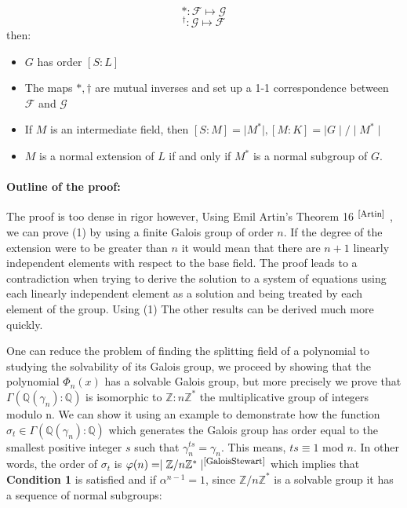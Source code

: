 \documentclass{article}
\begin{document}
$$\ast : \mathscr{F} \mapsto \mathscr{G}$$
$$^{\dagger} : \mathscr{G} \mapsto \mathscr{F}$$
then:
    \begin{itemize}
        \item[(1)] $G$ has order $[S : L]$
        \item [(2)] The maps $\ast, \dagger$ are mutual inverses and set up a 1-1 correspondence between $\mathscr{F}$ and $\mathscr{G}$
        \item[(3)] If $M$ is an intermediate field, then $[S : M] = \mid M^{\ast} \mid, [M : K] = \mid G\mid/\mid M^{\ast} \mid$
        \item[(4)] $M$ is a normal extension of $L$ if and only if $M^{\ast}$ is a normal subgroup of $G$.
    \end{itemize}

\paragraph{Outline of the proof:}
The proof is too dense in rigor however, Using Emil Artin's Theorem 16 $^{\textrm{\footnotesize\cite{Artin}}}$ , we can prove (1) by using a finite Galois group of order $n$. If the degree of the extension were to be greater than $n$ it would mean that there are $n+1$ linearly independent elements with respect to the base field. The proof leads to a contradiction when trying to derive the solution to a system of equations using each linearly independent element as a solution and being treated by each element of the group. Using (1) The other results can be derived much more quickly.

\par
One can reduce the problem of finding the splitting field of a polynomial to studying the solvability of its Galois group, we proceed by showing that the polynomial $\Phi_n(x)$ has a solvable Galois group, but more precisely we prove that $\Gamma(\mathbb{Q}(\gamma_n) : \mathbb{Q})$ is isomorphic to $\mathbb{Z} : n\mathbb{Z}^*$ the multiplicative group of integers modulo n. We can show it using an example to demonstrate how the function $\sigma_t\in\Gamma(\mathbb{Q}(\gamma_n) : \mathbb{Q})$ which generates the Galois group has order equal to the smallest positive integer $s$ such that $\gamma_n^{ts} = \gamma_n$. This means, $ts \equiv 1$ mod $n$. In other words, the order of $\sigma_t$ is $\varphi(n) = \mid\mathbb{Z}/n\mathbb{Z}^* \mid ^{\textrm{\footnotesize\cite{GaloisStewart}}}$
which implies that \textbf{Condition 1} is satisfied and if $\alpha^{n-1} = 1$, since $\mathbb{Z}/n\mathbb{Z}^*$ is a solvable group it has a sequence of normal subgroups:
\end{document}

